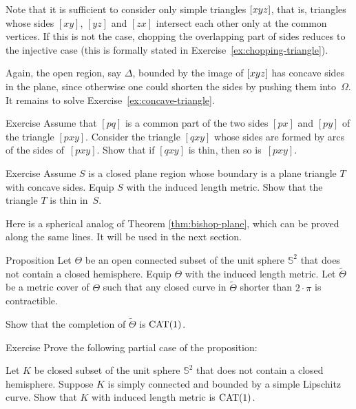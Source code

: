 Note that it is sufficient to consider only simple triangles $[xyz]$, 
that is, triangles whose sides $[xy]$, $[yz]$ and $[zx]$ intersect each other only at the common vertices.
If this is not the case, chopping the overlapping part of sides reduces to the injective case (this is formally stated in Exercise~\ref{ex:chopping-triangle}).

Again, the open region, say $\Delta$, bounded by the image of $[xyz]$  has concave sides in the plane, since otherwise one could shorten the sides by pushing them into~$\Omega$.
It remains to solve Exercise~\ref{ex:concave-triangle}.
\qeds

\begin{thm}{Exercise}\label{ex:chopping-triangle}
Assume that $[pq]$ is a common part of the two sides $[px]$ and $[py]$ of the triangle $[pxy]$.
Consider the triangle $[qxy]$ whose sides are formed by arcs of the sides of~$[pxy]$.
Show that if $[qxy]$ is thin, then so is~$[pxy]$.
\end{thm}


\begin{thm}{Exercise}\label{ex:concave-triangle}
Assume $S$ is a closed plane 
region whose boundary is a plane triangle $T$ with concave sides.
Equip $S$ with the induced length metric.
Show that the triangle $T$ is thin in~$S$.
\end{thm}



Here is a spherical analog of Theorem \ref{thm:bishop-plane},
which can be proved along the same lines.
It will be used in the next section. 

\begin{thm}{Proposition}\label{prop:bishop-sphere}
Let $\Theta$ be an open connected subset of the unit sphere $\mathbb{S}^2$ that does not contain a closed hemisphere.
Equip $\Theta$ with the induced length metric.
Let $\tilde \Theta$ be a metric cover of $\Theta$ 
such that any closed curve in $\tilde \Theta$ shorter than $2\cdot\pi$ is contractible.

Show that the completion of $\tilde \Theta$ is $\mathrm{CAT}(1)$.
\end{thm}

\begin{thm}{Exercise}\label{ex:bishop-sphere}
Prove the following partial case of the proposition:

Let $K$ be closed subset of the unit sphere $\mathbb{S}^2$ that does not contain a closed hemisphere.
Suppose $K$ is simply connected and bounded by a simple Lipschitz curve.
Show that $K$ with induced length metric is $\mathrm{CAT}(1)$.
\end{thm}


